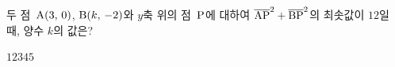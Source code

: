 두 점~$\mathrm{A}(3,\mkern3mu 0)$, $\mathrm{B}(k,\mkern3mu -2)$와 $y$축 위의 점~$\mathrm{P}$에 대하여 $\overline{\mathrm{AP}}^2+\overline{\mathrm{BP}}^2$의 최솟값이 $12$일 때, 양수 $k$의 값은?
\begin{choices32}{$1$}{$2$}{$3$}{$4$}{$5$}\end{choices32}
